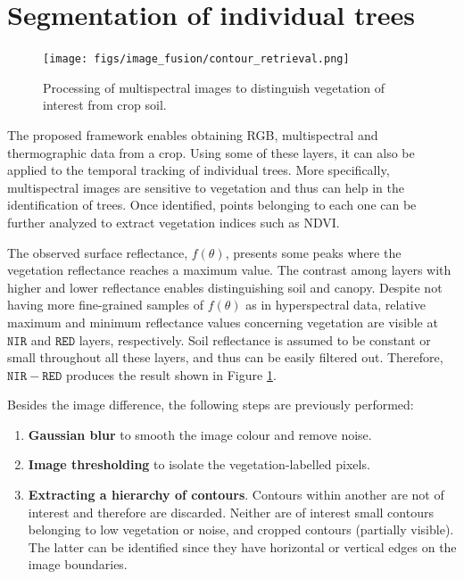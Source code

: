 \section{Segmentation of individual trees}

\begin{figure}
	\centering
	\texttt{[image: figs/image\_fusion/contour\_retrieval.png]}
	\caption{Processing of multispectral images to distinguish vegetation of interest from crop soil.}
	\label{fig:contour_extraction}
\end{figure}

The proposed framework enables obtaining RGB, multispectral and thermographic data from a crop. Using some of these layers, it can also be applied to the temporal tracking of individual trees. More specifically, multispectral images are sensitive to vegetation and thus can help in the identification of trees. Once identified, points belonging to each one can be further analyzed to extract vegetation indices such as NDVI. 

The observed surface reflectance, $f(\theta)$, presents some peaks where the vegetation reflectance reaches a maximum value. The contrast among layers with higher and lower reflectance enables distinguishing soil and canopy. Despite not having more fine-grained samples of $f(\theta)$ as in hyperspectral data, relative maximum and minimum reflectance values concerning vegetation are visible at $\mathtt{NIR}$ and $\mathtt{RED}$ layers, respectively. Soil reflectance is assumed to be constant or small throughout all these layers, and thus can be easily filtered out. Therefore, $\mathtt{NIR}-\mathtt{RED}$ produces the result shown in Figure \ref{fig:contour_extraction}.

Besides the image difference, the following steps are previously performed:
\begin{enumerate}
    \item \textbf{Gaussian blur} to smooth the image colour and remove noise.
    \item \textbf{Image thresholding} to isolate the vegetation-labelled pixels.
    \item \textbf{Extracting a hierarchy of contours}. Contours within another are not of interest and therefore are discarded. Neither are of interest small contours belonging to low vegetation or noise, and cropped contours (partially visible). The latter can be identified since they have horizontal or vertical edges on the image boundaries.
\end{enumerate}

